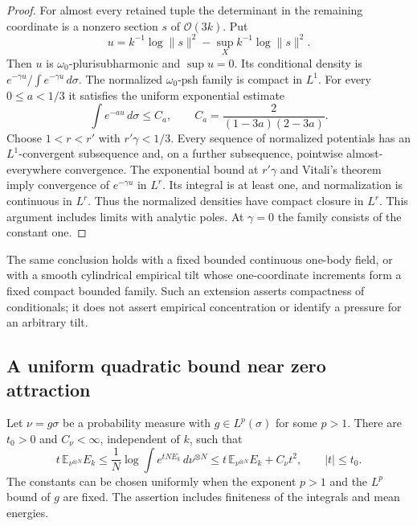 \begin{proof}
For almost every retained tuple the determinant in the remaining
coordinate is a nonzero section $s$ of $\mathcal O(3k)$. Put
\[
 u=k^{-1}\log\|s\|^2-\sup_X k^{-1}\log\|s\|^2.
\]
Then $u$ is $\omega_0$-plurisubharmonic and $\sup u=0$. Its
conditional density is $e^{-\gamma u}/\int e^{-\gamma u}\,d\sigma$.
The normalized $\omega_0$-psh family is compact in $L^1$.
For every $0\le a<1/3$ it satisfies the uniform exponential estimate
\[
 \int e^{-a u}\,d\sigma\le C_a,
 \qquad C_a=\frac2{(1-3a)(2-3a)}.
\]
Choose $1<r<r'$ with $r'\gamma<1/3$. Every sequence of normalized
potentials has an $L^1$-convergent subsequence and, on a further
subsequence, pointwise almost-everywhere convergence. The exponential
bound at $r'\gamma$ and Vitali's theorem imply convergence of
$e^{-\gamma u}$ in $L^r$. Its integral is at least one, and
normalization is continuous in $L^r$. Thus the normalized densities
have compact closure in $L^r$. This argument includes limits with
analytic poles. At $\gamma=0$ the family consists of the constant one.
\end{proof}

The same conclusion holds with a fixed bounded continuous one-body
field, or with a smooth cylindrical empirical tilt whose one-coordinate
increments form a fixed compact bounded family. Such an extension
asserts compactness of conditionals; it does not assert empirical
concentration or identify a pressure for an arbitrary tilt.

\subsection{A uniform quadratic bound near zero attraction}

\begin{lemma}
\label{att:quadratic-pressure}
Let $\nu=g\sigma$ be a probability measure with $g\in L^p(\sigma)$
for some $p>1$. There are $t_0>0$ and $C_\nu<\infty$, independent
of $k$, such that
\begin{equation}
 t\,\mathbb E_{\nu^{\otimes N}}E_k
 \le \frac1N\log\int e^{tN E_k}\,d\nu^{\otimes N}
 \le t\,\mathbb E_{\nu^{\otimes N}}E_k+C_\nu t^2,
 \qquad |t|\le t_0.
 \label{att:quadratic-bound}
\end{equation}
The constants can be chosen uniformly when the exponent $p>1$ and the $L^p$ bound of $g$ are fixed. The assertion includes finiteness of the integrals and mean energies.
\end{lemma}

